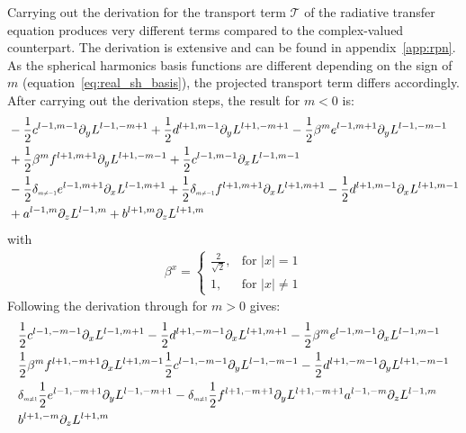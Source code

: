 Carrying out the derivation for the transport term $\mathcal{T}$ of the radiative transfer equation produces very different terms compared to the complex-valued counterpart. The derivation is extensive and can be found in appendix~\ref{app:rpn}. As the spherical harmonics basis functions are different depending on the sign of $m$ (equation~\ref{eq:real_sh_basis}), the projected transport term differs accordingly. After carrying out the derivation steps, the result for $m<0$ is:
\begin{align*}
&-\frac{1}{2}c^{{l-1,m-1}}
\partial_y
L^{l-1,-m+1}
+\frac{1}{2}d^{{l+1,m-1}}
\partial_y
L^{l+1,-m+1}
-\frac{1}{2}\beta^{m}e^{{l-1,m+1}}
\partial_y
L^{l-1,-m-1}
\\&
+\frac{1}{2}\beta^{m}f^{{l+1,m+1}}
\partial_y
L^{l+1,-m-1}
+\frac{1}{2}c^{{l-1,m-1}}
\partial_x
L^{l-1,m-1}
\\&
-\frac{1}{2}\delta_{\scaleto{m\neq -1}{4pt}}e^{{l-1,m+1}}
\partial_x
L^{l-1,m+1}
+\frac{1}{2}\delta_{\scaleto{m\neq -1}{4pt}}f^{{l+1,m+1}}
\partial_x
L^{l+1,m+1}
-\frac{1}{2}d^{{l+1,m-1}}
\partial_x
L^{l+1,m-1}
\\&
+a^{{l-1,m}}
\partial_z
L^{l-1,m}
+b^{{l+1,m}}
\partial_z
L^{l+1,m}
\end{align*}
with
\begin{align}
\label{eq:real_sh_basis}
\beta^{x}=
\left\{
\begin{array}{lr}
\frac{2}{\sqrt{2}}, & \text{for } \vert x\vert = 1\\
1, & \text{for } \vert x\vert \neq 1
\end{array}
\right.
\end{align}
Following the derivation through for $m>0$ gives:
\begin{align}
&
\frac{1}{2}c^{l-1,-m-1}\partial_x L^{l-1,m+1}
-\frac{1}{2}d^{l+1,-m-1}\partial_x L^{l+1,m+1}
-\frac{1}{2}\beta^{m}e^{l-1,m-1}\partial_x L^{l-1,m-1}
\nonumber
\\&
\frac{1}{2}\beta^{m}f^{l+1,-m+1}\partial_x L^{l+1,m-1}
\frac{1}{2}c^{l-1,-m-1}\partial_y L^{l-1,-m-1}
-\frac{1}{2}d^{l+1,-m-1}\partial_y L^{l+1,-m-1}
\nonumber
\\&
\delta_{\scaleto{m\neq 1}{4pt}}\frac{1}{2}e^{l-1,-m+1}\partial_y L^{l-1,-m+1}
-\delta_{\scaleto{m\neq 1}{4pt}}\frac{1}{2}f^{l+1,-m+1}\partial_y L^{l+1,-m+1}
a^{l-1,-m}\partial_z L^{l-1,m}
\nonumber
\\&
b^{l+1,-m}\partial_z L^{l+1,m}
\nonumber
\end{align}

